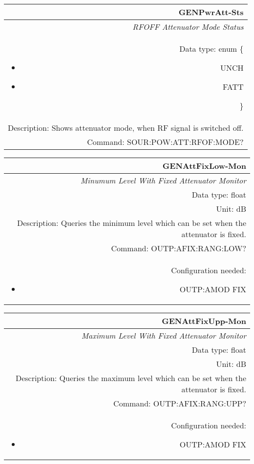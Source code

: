 \documentclass[openany]{article}
\begin{document}
		\begin{tabular}{N}
			\hline
			\bfseries GENPwrAtt-Sts \\ \hline
			\emph{RFOFF Attenuator Mode Status} \\
			Data type: enum \{\begin{itemize}[noitemsep]
				\small
				\item[] UNCH
				\item[] FATT
			\end{itemize}\} \\
			Description: Shows attenuator mode, when RF signal is switched off. \\
			Command: SOUR:POW:ATT:RFOF:MODE? \\

		\end{tabular}
%
		\begin{tabular}{N}
			\hline
			\bfseries GENAttFixLow-Mon \\ \hline
			\emph{Minumum Level With Fixed Attenuator Monitor} \\
			Data type: float \\
			Unit: dB \\
			Description: Queries the minimum level which can be set when the attenuator is fixed. \\
			Command: OUTP:AFIX:RANG:LOW? \\
			Configuration needed: \begin{itemize}[noitemsep]
				\small
				\item[] OUTP:AMOD FIX
			\end{itemize} \\

		\end{tabular}
%
		\begin{tabular}{N}
			\hline
			\bfseries GENAttFixUpp-Mon \\ \hline
			\emph{Maximum Level With Fixed Attenuator Monitor} \\
			Data type: float \\
			Unit: dB \\
			Description: Queries the maximum level which can be set when the attenuator is fixed. \\
			Command: OUTP:AFIX:RANG:UPP? \\
			Configuration needed: \begin{itemize}[noitemsep]
				\small
				\item[] OUTP:AMOD FIX
			\end{itemize} \\

		\end{tabular}
\end{document}
